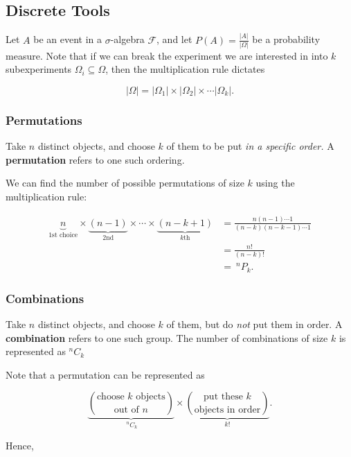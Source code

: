 
\subsection{Discrete Tools}

Let $A$ be an event in a $\sigma$-algebra $\mathcal F$, and let $P(A)=\frac{|A|}{|\Omega|}$ be a probability measure. Note that if we can break the experiment we are interested in into $k$ subexperiments $\Omega_i\subseteq \Omega$, then the multiplication rule dictates

$$
|\Omega|=|\Omega_1|\times |\Omega_2|\times \cdots |\Omega_k|.
$$
\subsubsection{Permutations}

\begin{definition}
Take $n$ distinct objects, and choose $k$ of them to be put \textit{in a specific order.} A \textbf{permutation} refers to one such ordering.
\end{definition}
We can find the number of possible permutations of size $k$ using the multiplication rule:

\begin{align*}
    \underbrace{n}_{\text{1st choice}}\times \underbrace{(n-1)}_{\text{2nd}}\times \cdots \times \underbrace{(n-k+1)}_{k\text{th}}&=\frac{n(n-1)\cdots 1}{(n-k)(n-k-1)\cdots 1} \\
    &=\frac{n!}{(n-k)!}\\
    &= \ ^nP_k.
\end{align*}

\subsubsection{Combinations}
\begin{definition}
Take $n$ distinct objects, and choose $k$ of them, but do \textit{not} put them in order. A \textbf{combination} refers to one such group. The number of combinations of size $k$ is represented as $^n C_k$
\end{definition}
Note that a permutation can be represented as

$$
\underbrace{\binom{\text{choose $k$ objects}}{\text{out of $n$}}}_{\ ^nC_k} \times \underbrace{\binom{\text{put these $k$}}{\text{objects in order}}}_{k!}.
$$

Hence,

